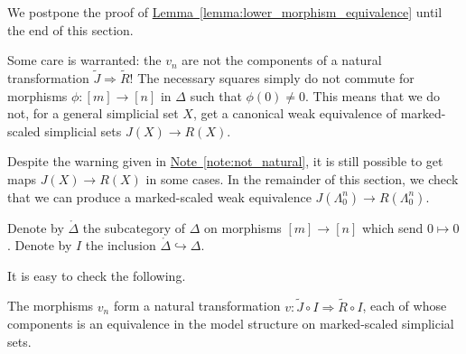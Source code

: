 \documentclass[main.tex]{subfiles}
\begin{document}
We postpone the proof of \hyperref[lemma:lower_morphism_equivalence]{Lemma~\ref*{lemma:lower_morphism_equivalence}} until the end of this section.

\begin{note}
  \label{note:not_natural}
  Some care is warranted: the $v_{n}$ are not the components of a natural transformation $\tilde{J} \Rightarrow \tilde{R}$! The necessary squares simply do not commute for morphisms $\phi\colon [m] \to [n]$ in $\Delta$ such that $\phi(0) \neq 0$. This means that we do not, for a general simplicial set $X$, get a canonical weak equivalence of marked-scaled simplicial sets $J(X) \to R(X)$.
\end{note}

Despite the warning given in \hyperref[note:not_natural]{Note~\ref*{note:not_natural}}, it is still possible to get maps $J(X) \to R(X)$ in some cases. In the remainder of this section, we check that we can produce a marked-scaled weak equivalence $J(\Lambda^{n}_{0}) \to R(\Lambda^{n}_{0})$.

\begin{notation}
  Denote by $\mathring{\Delta}$ the subcategory of $\Delta$ on morphisms $[m] \to [n]$ which send $0 \mapsto 0$. Denote by $I$ the inclusion $\mathring{\Delta} \hookrightarrow \Delta$.
\end{notation}

It is easy to check the following.
\begin{lemma}
  \label{lemma:restricted_natural_transformation}
  The morphisms $v_{n}$ form a natural transformation $v\colon \tilde{J} \circ I \Rightarrow \tilde{R} \circ I$, each of whose components is an equivalence in the model structure on marked-scaled simplicial sets.
\end{lemma}
\end{document}
